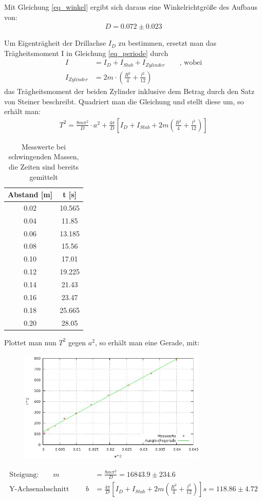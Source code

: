 Mit Gleichung \eqref{eq_winkel} ergibt sich daraus eine Winkelrichtgröße des Aufbaus von:
\begin{align*}
D=0.072 \pm0.023
\end{align*}


Um Eigenträgheit der Drillachse $I_D$ zu bestimmen, ersetzt man das Trägheitsmoment I in Gleichung \eqref{eq_periode} durch
\begin{align*}
I&=I_D+I_{Stab}+I_{Zylinder} \qquad \text{, wobei}\\
I_{Zylinder}&=2m\cdot\left(\frac{R^2}{4}+\frac{l^2}{12}\right)
\end{align*}
das Trägheitsmoment der beiden Zylinder inklusive dem Betrag durch den Satz von Steiner beschreibt.
Quadriert man die Gleichung und stellt diese um, so erhält man:
\begin{align}
T^2=\frac{8m\pi^2}{D}\cdot a^2 + \frac{4\pi}{D}  \left[  I_D+I_{Stab}+2m\left(\frac{R^2}{4}+\frac{l^2}{12}\right)\right]
\end{align}

\begin{table}[htbp]
\begin{tabular}{|c|c|}
\hline
Abstand [m] &	t [s]\\ \hline
0.02&	10.565\\ \hline
0.04&	11.85\\ \hline
0.06&	13.185\\ \hline
0.08&	15.56\\ \hline
0.10&	17.01\\ \hline
0.12&	19.225\\ \hline
0.14&	21.43\\ \hline
0.16&	23.47\\ \hline
0.18&	25.665\\ \hline
0.20&	28.05\\ \hline
\end{tabular} 
\caption{Messwerte bei schwingenden Massen, die Zeiten sind bereits gemittelt}
\end{table}

Plottet man nun $T^2$ gegen $a^2$, so erhält man eine Gerade, mit:
\begin{figure}[htbp]
\includegraphics[width=0.8\textwidth]{pics/eigentr.jpg}
\end{figure}
\begin{align*}
\text{Steigung:} \qquad m&=\frac{8m\pi^2}{D}=16843.9 \pm 234.6\\
\text{Y-Achsenabschnitt }\qquad b&=\frac{4\pi}{D}  \left[  I_D+I_{Stab}+2m\left(\frac{R^2}{4}+\frac{l^2}{12}\right)\right]s=118.86 \pm 4.72
\end{align*}

